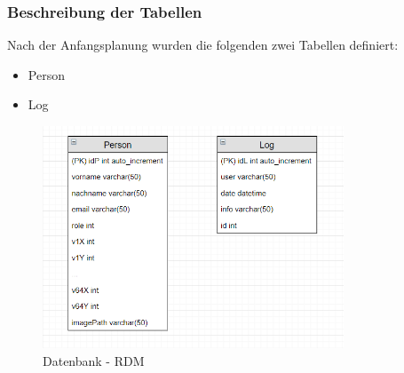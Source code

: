 \subsubsection{Beschreibung der Tabellen}
Nach der Anfangsplanung wurden die folgenden zwei Tabellen definiert:
\begin{itemize}
	\item Person
	\item Log
\end{itemize}
\begin{figure}[!htb]
  \centering
    \includegraphics[width=0.8\textwidth]{./figures/db.png}
      \caption{Datenbank - RDM}
\end{figure}
